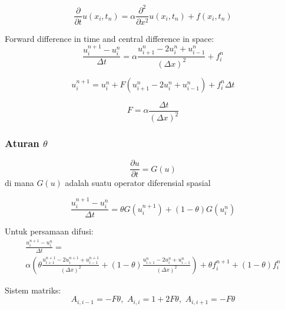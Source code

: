 \documentclass[9pt]{beamer}
\begin{document}
\begin{frame}

\begin{equation}
\frac{\partial}{\partial t} u(x_{i}, t_{n}) =
\alpha \frac{\partial^2}{\partial x^2} u(x_{i}, t_{n}) + f(x_{i}, t_{n})
\end{equation}

Forward difference in time and central difference in space:
\begin{equation}
\frac{u^{n+1}_{i} - u^{n}_{i}}{\Delta t} = 
\alpha \frac{u^{n}_{i+1} - 2u^{n}_{i} + u^{n}_{i-1}}{(\Delta x)^2} + f^{n}_{i}
\end{equation}

\begin{equation*}
u^{n+1}_{i} = u^{n}_{i} +
F \left(
u^{n}_{i+1} - 2u^{n}_{i} + u^{n}_{i-1}
\right) + f^{n}_{i} \Delta t
\end{equation*}

\begin{equation}
F = \alpha \frac{\Delta t}{(\Delta x)^2}
\end{equation}

\end{frame}



\begin{frame}
\frametitle{Aturan $\theta$}

\begin{equation}
\frac{\partial u}{\partial t} = G(u)
\end{equation}
di mana $G(u)$ adalah suatu operator diferensial spasial

\begin{equation}
\frac{u_{i}^{n+1} - u_{i}^{n}}{\Delta t} = \theta G(u_{i}^{n+1}) + (1 - \theta) G(u_{i}^{n})
\end{equation}

Untuk persamaan difusi:
\begin{multline}
\frac{u_{i}^{n+1} - u_{i}^{n}}{\Delta t} = \\
\alpha \left(
\theta \frac{u_{i+1}^{n+1} - 2u_{i}^{n+1} + u_{i-1}^{n+1}}{(\Delta x)^2} +
(1 - \theta) \frac{u_{i+1}^{n} - 2u_{i}^{n} + u_{i-1}^{n}}{(\Delta x)^2}
\right) +
\theta f_{i}^{n+1} + (1 - \theta)f_{i}^{n}
\end{multline}

Sistem matriks:
\begin{equation}
A_{i,i-1} = -F\theta, \,\, A_{i,i} = 1 + 2F\theta, \,\, A_{i,i+1} = -F\theta
\end{equation}



\end{frame}
\end{document}
